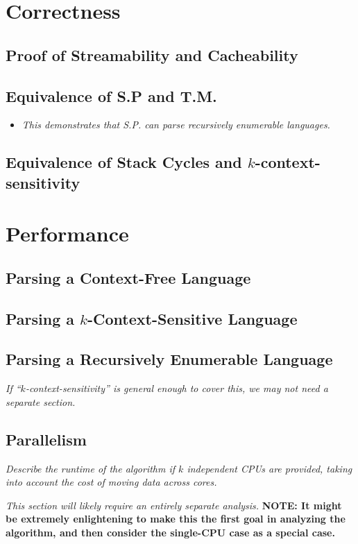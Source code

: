 \documentclass{article}
\begin{document}
\section{Correctness}
\subsection{Proof of Streamability and Cacheability}
\subsection{Equivalence of S.P and T.M.}
\begin{itemize}
  \item \textit{This demonstrates that S.P. can parse recursively enumerable languages.}
\end{itemize}
\subsection{Equivalence of Stack Cycles and $k$-context-sensitivity}

\section{Performance}
\subsection{Parsing a Context-Free Language}
\subsection{Parsing a $k$-Context-Sensitive Language}
\subsection{Parsing a Recursively Enumerable Language}
\textit{If ``$k$-context-sensitivity'' is general enough to cover this, we may not need a separate section.}

\subsection{Parallelism}
\textit{Describe the runtime of the algorithm if $k$ independent CPUs are provided, taking into account the cost of moving data across cores.}

\textit{This section will likely require an entirely separate analysis.} \textbf{NOTE: It might be extremely enlightening to make this the first goal in analyzing the algorithm, and then consider the single-CPU case as a special case.}
\end{document}
